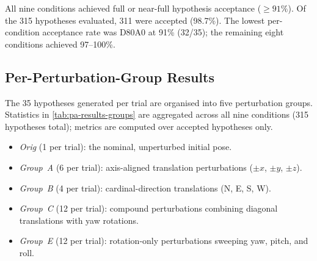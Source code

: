 All nine conditions achieved full or near-full hypothesis acceptance ($\geq 91\%$). Of the 315 hypotheses evaluated, 311 were accepted (98.7\%). The lowest per-condition acceptance rate was D80A0 at 91\% (32/35); the remaining eight conditions achieved 97--100\%.

\subsection{Per-Perturbation-Group Results}
\label{subsec:pa-results-perturbation-groups}

The 35 hypotheses generated per trial are organised into five perturbation groups. Statistics in \cref{tab:pa-results-groups} are aggregated across all nine conditions (315 hypotheses total); metrics are computed over accepted hypotheses only.

\begin{itemize}
  \item \emph{Orig} (1 per trial): the nominal, unperturbed initial pose.
  \item \emph{Group~A} (6 per trial): axis-aligned translation perturbations ($\pm x$, $\pm y$, $\pm z$).
  \item \emph{Group~B} (4 per trial): cardinal-direction translations (N, E, S, W).
  \item \emph{Group~C} (12 per trial): compound perturbations combining diagonal translations with yaw rotations.
  \item \emph{Group~E} (12 per trial): rotation-only perturbations sweeping yaw, pitch, and roll.
\end{itemize}

